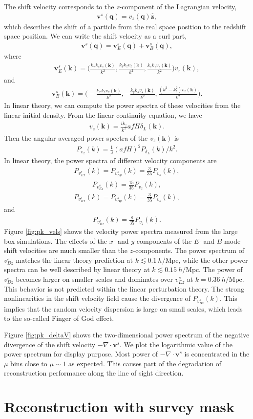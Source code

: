 \documentclass[aps,prx,twocolumn,superscriptaddress,groupedaddress,nofootinbib,amsfont]{revtex4}  %
\newcommand{\mr}{\mathrm}
\newcommand{\bea}{\begin{eqnarray}}
\newcommand{\eea}{\end{eqnarray}}
\newcommand{\bmv}{\bm{v}}
\newcommand{\bmk}{\bm{k}}
\newcommand{\bmq}{\bm{q}}
\begin{document}
The shift velocity corresponds to the $z$-component of the Lagrangian velocity,
\bea
\bmv^s(\bmq)=v_z(\bmq)\hat{\bm{z}},
\eea
which describes the shift of a particle from the real space position to the 
redshift space position. We can write the shift velocity as 
a curl part,
\bea
\bmv^s(\bmq)=\bmv_E^s(\bmq)+\bmv^s_B(\bmq),
\eea
where 
\bea
\bmv^s_E(\bmk)=\bigg(\frac{k_xk_zv_z(\bmk)}{k^2},\frac{k_yk_zv_z(\bmk)}{k^2},\frac{k_zk_zv_z(\bmk)}{k^2}\bigg)v_z(\bmk),
\eea
and 
\bea
\bmv^s_B(\bmk)=\bigg(-\frac{k_xk_zv_z(\bmk)}{k^2},-\frac{k_yk_zv_z(\bmk)}{k^2},\frac{(k^2-k_z^2)v_z(\bmk)}{k^2}\bigg).
\eea
In linear theory, we can compute the power spectra of these velocities from the 
linear initial density.
From the linear continuity equation, we have 
\bea
v_z(\bmk)=\frac{ik_z}{k^2}afH\delta_L(\bmk).
\eea
Then the angular averaged power spectra of the $v_z(\bmk)$ is
\bea
P_{v_z}(k)=\frac{1}{3}(afH)^2P_{\delta_L}(k)/{k^2}.
\eea
In linear theory, the power spectra of different velocity components are
\bea
P_{v^s_{Ex}}(k)=P_{v^s_{Ey}}(k)=\frac{3}{35}P_{v_z}(k),
\eea
\bea
P_{v^s_{Ez}}(k)=\frac{15}{35}P_{v_z}(k),
\eea
\bea
P_{v^s_{Bx}}(k)=P_{v^s_{By}}(k)=\frac{3}{35}P_{v_z}(k),
\eea
and
\bea
P_{v^s_{Bz}}(k)=\frac{8}{35}P_{v_z}(k).
\eea
Figure \ref{fig:pk_vels} shows the velocity power spectra measured from the 
large box simulations. The effects of the $x$- and $y$-components of the $E$-
and $B$-mode shift velocities are much smaller than the $z$-components. 
The power spectrum of ${v^s_{Bz}}$ matches the linear theory prediction at 
$k\lesssim0.1\ h/\mr{Mpc}$, while the other power spectra can be well described 
by linear theory at $k\lesssim0.15\ h/\mr{Mpc}$. The power of $v^s_{Bz}$ becomes
larger on smaller scales and dominates over $v^s_{Ez}$ at $k=0.36\ h/\mr{Mpc}$.
This behavior is not predicted within the linear perturbation theory. 
The strong nonlinearities in the shift velocity field cause the divergence of 
$P_{v^s_{Bz}}(k)$. This implies that the random velocity dispersion is large on 
small scales, which leads to the so-called Finger of God effect.

Figure \ref{fig:pk_deltaV} shows the two-dimensional power spectrum of the 
negative divergence of the shift velocity $-\nabla\cdot\bmv^s$.
We plot the logarithmic value of the power spectrum for display purpose.
Most power of $-\nabla\cdot\bmv^s$ is concentrated in the $\mu$ bins close to 
$\mu\sim1$ as expected. This causes part of the degradation of reconstruction
performance along the line of sight direction.

\section{Reconstruction with survey mask}
\label{appendix:E}
\end{document}
